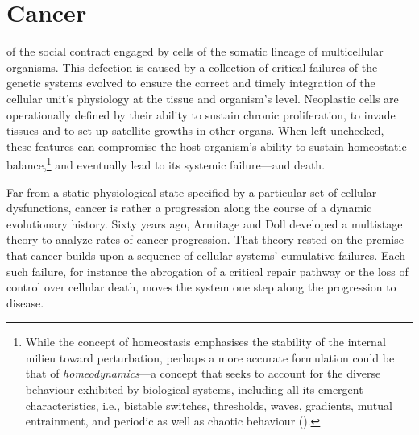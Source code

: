 \section{Cancer}


 of the social contract engaged by cells of the
somatic lineage of multicellular organisms.  This defection is caused by a
collection of critical failures of the genetic systems evolved to ensure the
correct and timely integration of the cellular unit's physiology at the tissue
and organism's level.  Neoplastic cells are operationally defined by their
ability to sustain chronic proliferation, to invade tissues and to set up
satellite growths in other organs.  When left unchecked, these features can
compromise the host organism's ability to sustain homeostatic
balance,\footnote{While the concept of homeostasis emphasises the stability of
  the internal milieu toward perturbation, perhaps a more accurate formulation
  could be that of \mbox{\emph{homeodynamics}}---a concept that seeks to account
  for the diverse behaviour exhibited by biological systems, including all its
  emergent characteristics, i.e., bistable switches, thresholds, waves,
  gradients, mutual entrainment, and periodic as well as chaotic behaviour
  (\citealp{lloyd_why_2001}).} and eventually lead to its systemic failure---and
death.

\bigskip



Far from a static physiological state specified by a particular set of cellular
dysfunctions, cancer is rather a progression along the course of a dynamic
evolutionary history.  Sixty years ago, Armitage and
Doll\cite{armitage_age_1954} developed a multistage theory to analyze rates of
cancer progression.  That theory rested on the premise that cancer builds upon a
sequence of cellular systems' cumulative failures.  Each such failure, for
instance the abrogation of a critical  repair pathway or the loss
of control over cellular death, moves the system one step along the progression
to disease.\cite{frank_dynamics_2007}

